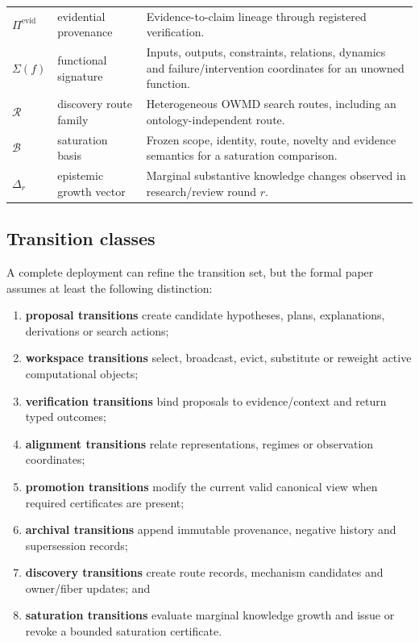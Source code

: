\begin{longtable}{>{\raggedright\arraybackslash}p{} >{\raggedright\arraybackslash}p{} >{\raggedright\arraybackslash}p{}}
\(\Pi^{\mathrm{evid}}\) & evidential provenance & Evidence-to-claim lineage through registered verification. \\
\(\Sigma(f)\) & functional signature & Inputs, outputs, constraints, relations, dynamics and failure/intervention coordinates for an unowned function. \\
\(\mathcal R\) & discovery route family & Heterogeneous OWMD search routes, including an ontology-independent route. \\
\(\mathcal B\) & saturation basis & Frozen scope, identity, route, novelty and evidence semantics for a saturation comparison. \\
\(\Delta_r\) & epistemic growth vector & Marginal substantive knowledge changes observed in research/review round \(r\). \\
\bottomrule
\end{longtable}

\subsection{Transition classes}

A complete deployment can refine the transition set, but the formal paper assumes at least the following distinction:

\begin{enumerate}[leftmargin=*]
\item \textbf{proposal transitions} create candidate hypotheses, plans, explanations, derivations or search actions;
\item \textbf{workspace transitions} select, broadcast, evict, substitute or reweight active computational objects;
\item \textbf{verification transitions} bind proposals to evidence/context and return typed outcomes;
\item \textbf{alignment transitions} relate representations, regimes or observation coordinates;
\item \textbf{promotion transitions} modify the current valid canonical view when required certificates are present;
\item \textbf{archival transitions} append immutable provenance, negative history and supersession records;
\item \textbf{discovery transitions} create route records, mechanism candidates and owner/fiber updates; and
\item \textbf{saturation transitions} evaluate marginal knowledge growth and issue or revoke a bounded saturation certificate.
\end{enumerate}

